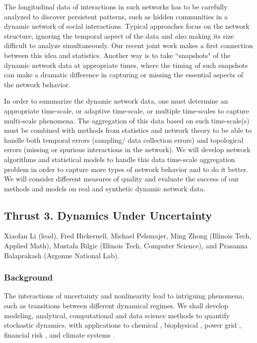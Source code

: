 \documentclass[11pt]{NSFamsart}
\begin{document}
The longitudinal data of interactions in such networks has to be carefully analyzed to discover persistent patterns, such as hidden communities in a dynamic network of social interactions. Typical approaches focus on the network structure, ignoring the temporal aspect of the data and also making its size difficult to analyze simultaneously. Our recent joint work \cite{tergms} makes a first connection between this idea and statistics. Another way is to take ``snapshots" of the dynamic network data at appropriate times, where the timing of such snapshots can make a dramatic difference in capturing or missing the essential aspects of the network behavior. 

In order to summarize the dynamic network data, one must determine an appropriate time-scale, or adaptive time-scale, or multiple time-scales to capture multi-scale phenomena. The aggregation of this data based on such time-scale(s) must be combined with methods from statistics and network theory to be able to handle both temporal errors (sampling/ data collection errors) and topological errors (missing or spurious interactions in the network).  We will develop network algorithms and statistical models to handle this data time-scale aggregation problem in order to capture more types of network behavior and to do it better.  We will  consider different measures of quality and evaluate the success of our methods and models on  real and synthetic dynamic network data.






\subsection*{Thrust 3. Dynamics  Under Uncertainty } 
Xiaofan Li (lead), Fred Hickernell, Michael Pelsmajer, Ming Zhong (Illinois Tech, Applied Math), Mustafa Bilgic (Illinois Tech, Computer Science),  and Prasanna Balaprakash (Argonne National Lab). 

\subsubsection*{Background} The interactions of uncertainty and nonlinearity lead to intriguing phenomena, such as  transitions between  different dynamical regimes. We shall develop modeling, analytical, computational and data science  methods to quantify stochastic dynamics, with applications to chemical \cite{agaoglou_chemical_2019}, biophysical \cite{Ruoff2018BiologicalCR}, power grid \cite{MEDJROUBI201714}, financial risk \cite{DixHaBil20a,Gla03}, and climate systems \cite{Alexandrov2020NonlinearCD, Franzke2017NonlinearAS, Wan2020ADF}. 
 
\end{document}
